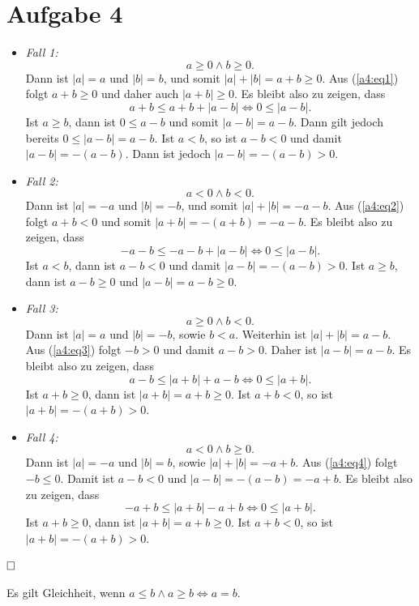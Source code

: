 \documentclass[12pt,a4paper]{article}
\newcommand{\qed}{\null\nobreak\hfill\square}
\begin{document}
\section*{Aufgabe 4}

\begin{itemize}
    \item \textit{Fall 1:} \begin{equation}
    \label{a4:eq1}
        a \geq 0 \wedge b \geq 0.
    \end{equation}
    Dann ist $|a| = a$ und $|b| = b$, und somit $|a| + |b| = a + b \geq 0.$
    Aus (\ref{a4:eq1}) folgt $a + b \geq 0$ und daher auch $|a+b| \geq 0.$
    Es bleibt also zu zeigen, dass
    \[
    a + b \leq a + b + |a-b| \Leftrightarrow 0 \leq |a-b|.
    \]
    Ist $a \geq b$, dann ist $0 \leq a - b$ und somit $|a-b| = a-b.$ Dann gilt jedoch bereits $0 \leq |a-b| = a-b.$
    Ist $a < b$, so ist $a-b < 0$ und damit $|a-b| = -(a-b).$ Dann ist jedoch $|a-b| = -(a-b) > 0$.
    \item \textit{Fall 2:} \begin{equation}
        \label{a4:eq2}
        a < 0 \wedge b < 0.
    \end{equation}
    Dann ist $|a| = -a$ und $|b| = -b$, und somit $|a| + |b| = -a-b.$
    Aus (\ref{a4:eq2}) folgt $a + b < 0$ und somit $|a + b| = - (a + b) = -a-b.$
    Es bleibt also zu zeigen, dass
    \[
    -a-b \leq -a-b + |a-b| \Leftrightarrow 0 \leq |a-b|.
    \]
    Ist $a < b$, dann ist $a-b < 0$ und damit $|a-b| = -(a-b) > 0$.
    Ist $a \geq b$, dann ist $a-b \geq 0$ und $|a-b| = a-b \geq 0$.
    \item \textit{Fall 3:} \begin{equation}
        \label{a4:eq3}
        a \geq 0 \wedge b < 0.
    \end{equation}
    Dann ist $|a| = a$ und $|b| = -b$, sowie $b < a$. Weiterhin ist $|a| + |b| = a-b$.\\
    Aus (\ref{a4:eq3}) folgt $-b > 0$ und damit $a-b > 0$. Daher ist $|a-b| = a-b$.
    Es bleibt also zu zeigen, dass
    \[
    a-b \leq |a+b| + a-b \Leftrightarrow 0 \leq |a+b|.
    \]
    Ist $a + b \geq 0$, dann ist $|a+b| = a+b \geq 0$.
    Ist $a+b < 0$, so ist $|a+b| = - (a + b) > 0$.
    \item \textit{Fall 4:} \begin{equation}
    \label{a4:eq4}
        a < 0 \wedge b \geq 0.
    \end{equation}
    Dann ist $|a| = -a$ und $|b| = b$, sowie $|a| + |b| = -a+b$.
    Aus (\ref{a4:eq4}) folgt $-b \leq 0$.
    Damit ist $a-b < 0$ und $|a-b| = -(a-b) = -a+b$.
    Es bleibt also zu zeigen, dass
    \[
    -a+b \leq |a+b|-a+b \Leftrightarrow 0 \leq |a+b|.
    \]
    Ist $a+b \geq 0$, dann ist $|a+b| = a+b \geq 0$.
    Ist $a+b < 0$, so ist $|a+b| = -(a+b) > 0$.
\end{itemize}
$\qed$

Es gilt Gleichheit, wenn $a \leq b \wedge a \geq b \Leftrightarrow a = b$.


\end{document}
